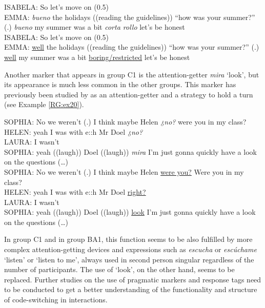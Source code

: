 \documentclass[output=paper]{langscibook}
\begin{document}
\begin{exe}\ex\label{RG:ex19}
ISABELA:  So let’s move on (0.5)\\
EMMA: \textit{bueno} the holidays ((reading the guidelines)) “how was your summer?” (.) \textit{bueno} my summer was a bit \textit{corta rollo} let’s be honest\\

ISABELA: So let’s move on (0.5)\\
EMMA: \ul{well} the holidays ((reading the guidelines)) “how was your summer?” (.) \ul{well} my summer was a bit \ul{boring/restricted} let’s be honest
\end{exe}

Another marker that appears in group C1 is the attention-getter \textit{mira} ‘look’, but its appearance is much less common in the other groups. This marker has previously been studied by \citet[447]{goria_functional_2017} as an attention-getter and a strategy to hold a turn (see Example \ref{RG:ex20}).

\begin{exe}\ex\label{RG:ex20}
SOPHIA:  No we weren’t (.) I think maybe Helen \textit{¿no?} were you in my class?\\
HELEN: yeah I was with e::h Mr Doel \textit{¿no?}\\
LAURA: I wasn’t\\
SOPHIA: yeah ((laugh)) Doel ((laugh)) \textit{mira} I’m just gonna quickly have a look on the questions (…)\\

SOPHIA: No we weren’t (.) I think maybe Helen \ul{were you?} Were you in my class?\\
HELEN: yeah I was with e::h Mr Doel \ul{right?}\\
LAURA: I wasn’t\\
SOPHIA: yeah ((laugh)) Doel ((laugh)) \ul{look} I’m just gonna quickly have a look on the questions (…)
\end{exe}

In group C1 and in group BA1, this function seems to be also fulfilled by more complex attention-getting devices and expressions such as \textit{escucha} or \textit{escúchame} ‘listen’ or ‘listen to me’, always used in second person singular regardless of the number of participants. The use of ‘look’, on the other hand, seems to be replaced. Further studies on the use of pragmatic markers and response tags need to be conducted to get a better understanding of the functionality and structure of code-switching in interactions.
\end{document}
